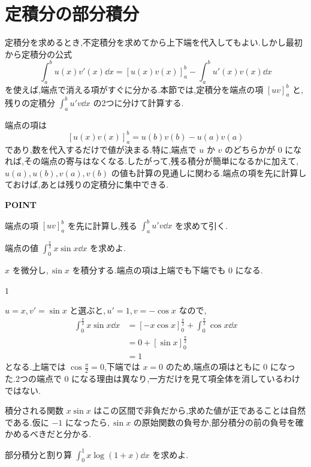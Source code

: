 \section{定積分の部分積分}\label{節:定積分の部分積分}

定積分を求めるとき,不定積分を求めてから上下端を代入してもよい.しかし最初から定積分の公式
\[
 \int_a^b u(x)v'(x)\dd x=[u(x)v(x)]_a^b-\int_a^b u'(x)v(x)\dd x
\]
を使えば,端点で消える項がすぐに分かる.本節では,定積分を端点の項 $[uv]_a^b$ と,残りの定積分 $\int_a^b u'v\dd x$ の2つに分けて計算する.

端点の項は
\[
 [u(x)v(x)]_a^b=u(b)v(b)-u(a)v(a)
\]
であり,数を代入するだけで値が決まる.特に,端点で $u$ か $v$ のどちらかが $0$ になれば,その端点の寄与はなくなる.したがって,残る積分が簡単になるかに加えて,\,$u(a),u(b),v(a),v(b)$ の値も計算の見通しに関わる.端点の項を先に計算しておけば,あとは残りの定積分に集中できる.

\begin{bookpoint}
\textbf{POINT}\par
端点の項 $[uv]_a^b$ を先に計算し,残る $\int_a^b u'v\dd x$ を求めて引く.
\end{bookpoint}

\begin{example}{端点の値}
$\int_0^{\frac\pi2}x\sin x\dd x$ を求めよ.
\end{example}

$x$ を微分し,\,$\sin x$ を積分する.端点の項は上端でも下端でも $0$ になる.

$1$

$u=x$,\,$v'=\sin x$ と選ぶと,\,$u'=1$,\,$v=-\cos x$ なので,
\[
\begin{aligned}
 \int_0^{\frac\pi2}x\sin x\dd x
 &=[-x\cos x]_0^{\frac\pi2}
   +\int_0^{\frac\pi2}\cos x\dd x\\
 &=0+[\sin x]_0^{\frac\pi2}\\
 &=1
\end{aligned}
\]
となる.上端では $\cos\frac\pi2=0$,下端では $x=0$ のため,端点の項はともに $0$ になった.2つの端点で $0$ になる理由は異なり,一方だけを見て項全体を消しているわけではない.

積分される関数 $x\sin x$ はこの区間で非負だから,求めた値が正であることは自然である.仮に $-1$ になったら,\,$\sin x$ の原始関数の負号か,部分積分の前の負号を確かめるべきだと分かる.

\begin{example}{部分積分と割り算}
$\int_0^1x\log(1+x)\dd x$ を求めよ.
\end{example}

